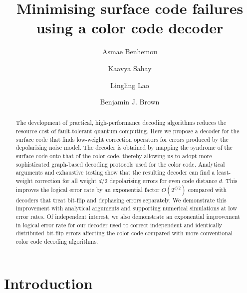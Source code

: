 \documentclass[a4paper,twocolumn,11pt,accepted=2024-12-23]{quantumarticle}
\begin{document}
\title{Minimising surface code failures using a color code decoder}

\author{Asmae Benhemou}

\author{Kaavya Sahay}

\author{Lingling Lao}

\author{Benjamin J. Brown}

\maketitle

\begin{abstract}
The development of practical, high-performance decoding algorithms reduces the resource cost of fault-tolerant quantum computing. Here we propose a decoder for the surface code that finds low-weight correction operators for errors produced by the depolarising noise model. The decoder is obtained by mapping the syndrome of the surface code onto that of the color code, thereby allowing us to adopt more sophisticated graph-based decoding protocols used for the color code. Analytical arguments and exhaustive testing show that the resulting decoder can find a least-weight correction for all weight $d/2$ depolarising errors for even code distance $d$. This improves the logical error rate by an exponential factor $O(2^{d/2})$ compared with decoders that treat bit-flip and dephasing errors separately. We demonstrate this improvement with analytical arguments and supporting numerical simulations at low error rates. Of independent interest, we also demonstrate an exponential improvement in logical error rate for our decoder used to correct independent and identically distributed bit-flip errors affecting the color code compared with more conventional color code decoding algorithms. 
\end{abstract}

\section{Introduction}
\end{document}
